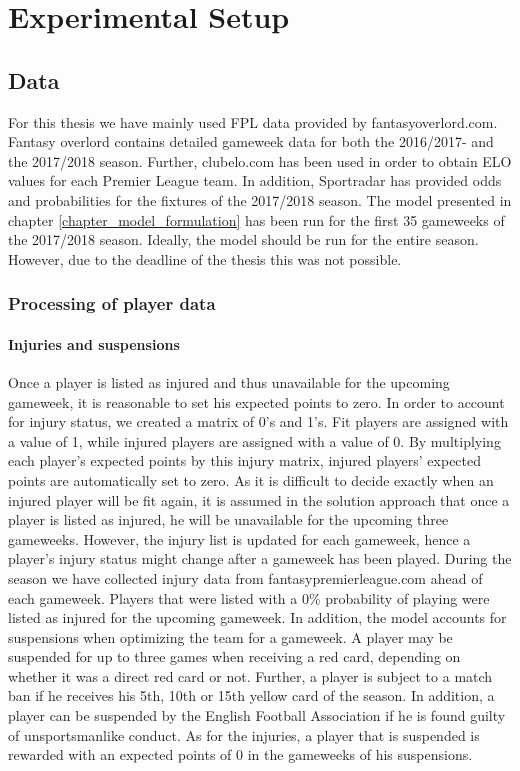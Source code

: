 \chapter{Experimental Setup}



\section{Data}
For this thesis we have mainly used FPL data provided by fantasyoverlord.com. Fantasy overlord contains detailed gameweek data for both the 2016/2017- and the 2017/2018 season. Further, clubelo.com has been used in order to obtain ELO values for each Premier League team. In addition, Sportradar has provided odds and probabilities for the fixtures of the 2017/2018 season. 
\newpar
The model presented in chapter \ref{chapter_model_formulation} has been run for the first 35 gameweeks of the 2017/2018 season. Ideally, the model should be run for the entire season. However, due to the deadline of the thesis this was not possible. 

\subsection{Processing of player data}
\subsubsection{Injuries and suspensions}
Once a player is listed as injured and thus unavailable for the upcoming gameweek, it is reasonable to set his expected points to zero. In order to account for injury status, we created a matrix of 0's and 1's. Fit players are assigned with a value of 1, while injured players are assigned with a value of 0. By multiplying each player's expected points by this injury matrix, injured players' expected points are automatically set to zero. As it is difficult to decide exactly when an injured player will be fit again, it is assumed in the solution approach that once a player is listed as injured, he will be unavailable for the upcoming three gameweeks. However, the injury list is updated for each gameweek, hence a player's injury status might change after a gameweek has been played. During the season we have collected injury data from fantasypremierleague.com ahead of each gameweek. Players that were listed with a 0\% probability of playing were listed as injured for the upcoming gameweek. 
\newpar
In addition, the model accounts for suspensions when optimizing the team for a gameweek. A player may be suspended for up to three games when receiving a red card, depending on whether it was a direct red card or not. Further, a player is subject to a match ban if he receives his 5th, 10th or 15th yellow card of the season. In addition, a player can be suspended by the English Football Association if he is found guilty of unsportsmanlike conduct. As for the injuries, a player that is suspended is rewarded with an expected points of 0 in the gameweeks of his suspensions. 

